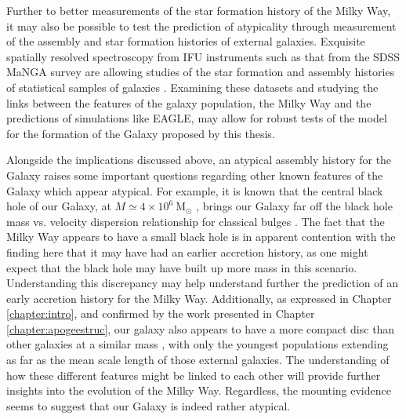 Further to better measurements of the star formation history of the Milky Way, it may also be possible to test the prediction of atypicality through measurement of the assembly and star formation histories of external galaxies. Exquisite spatially resolved spectroscopy from IFU instruments such as that from the SDSS MaNGA survey \citep[Mapping Nearby Galaxies at Apache Point Observatory;][]{2015ApJ...798....7B} are allowing studies of the star formation and assembly histories of statistical samples of galaxies \citep[e.g.][]{2016MNRAS.463.2799I,2018MNRAS.480.2544R}. Examining these datasets and studying the links between the features of the galaxy population, the Milky Way and the predictions of simulations like EAGLE, may allow for robust tests of the model for the formation of the Galaxy proposed by this thesis.

Alongside the implications discussed above, an atypical assembly history for the Galaxy raises some important questions regarding other known features of the Galaxy which appear atypical. For example, it is known that the central black hole of our Galaxy, at $M \simeq 4\times 10^{6}\ \mathrm{M_{\odot}}$ \citep[e.g.][]{2009ApJ...707L.114G}, brings our Galaxy far off the black hole mass vs. velocity dispersion relationship for classical bulges \citep[e.g.][]{2013ARA&A..51..511K}. The fact that the Milky Way appears to have a small black hole is in apparent contention with the finding here that it may have had an earlier accretion history, as one might expect that the black hole may have built up more mass in this scenario. Understanding this discrepancy may help understand further the prediction of an early accretion history for the Milky Way. Additionally, as expressed in Chapter \ref{chapter:intro}, and confirmed by the work presented in Chapter \ref{chapter:apogeestruc}, our galaxy also appears to have a more compact disc than other galaxies at a similar mass \citep[e.g. those shown in][]{2010MNRAS.406.1595F}, with only the youngest populations extending as far as the mean scale length of those external galaxies. The understanding of how these different features might be linked to each other will provide further insights into the evolution of the Milky Way. Regardless, the mounting evidence seems to suggest that our Galaxy is indeed rather atypical.



